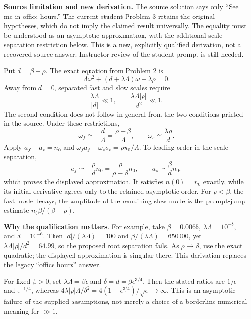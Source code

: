 \begin{draftsolution}
\textbf{Source limitation and new derivation.} The source solution says only
``See me in office hours.'' The current student Problem 3 retains the
original hypotheses, which do not imply the claimed result universally.
The equality must be understood as an asymptotic approximation, with the
additional scale-separation restriction below. This is a new, explicitly
qualified derivation, not a recovered source answer. Instructor review of
the student prompt is still needed.

Put $d=\beta-\rho$. The exact equation from Problem 2 is
\[
\Lambda\omega^2+(d+\lambda\Lambda)\omega-\lambda\rho=0.
\]
Away from $d=0$, separated fast and slow scales require
\[
\frac{\lambda\Lambda}{|d|}\ll1,\qquad
\frac{\lambda\Lambda|\rho|}{d^2}\ll1.
\]
The second condition does not follow in general from the two conditions
printed in the source. Under these restrictions,
\[
\omega_f\simeq-\frac d\Lambda=\frac{\rho-\beta}\Lambda,
\qquad \omega_s\simeq\frac{\lambda\rho}d.
\]
Apply $a_f+a_s=n_0$ and
$\omega_f a_f+\omega_s a_s=\rho n_0/\Lambda$.
To leading order in the scale separation,
\[
a_f\simeq-\frac\rho d n_0=\frac\rho{\rho-\beta}n_0,
\qquad a_s\simeq\frac\beta d n_0,
\]
which proves the displayed approximation. It satisfies $n(0)=n_0$ exactly,
while its initial derivative agrees only to the retained asymptotic order.
For $\rho<\beta$, the fast mode decays; the amplitude of the remaining
slow mode is the prompt-jump estimate $n_0\beta/(\beta-\rho)$.

\textbf{Why the qualification matters.} For example, take
$\beta=0.0065$, $\lambda\Lambda=10^{-8}$, and $d=10^{-6}$.
Then $|d|/(\lambda\Lambda)=100$ and $\beta/(\lambda\Lambda)=650000$, yet
$\lambda\Lambda|\rho|/d^2=64.99$, so the proposed root separation fails.
As $\rho\to\beta$, use the exact quadratic; the displayed approximation
is singular there. This derivation replaces the legacy ``office hours'' answer.

For fixed $\beta>0$, set $\lambda\Lambda=\beta\epsilon$ and
$\delta=d=\beta\epsilon^{3/4}$. Then the stated ratios are
$1/\epsilon$ and $\epsilon^{-1/4}$, whereas
$4\lambda|\rho|\Lambda/\delta^2
=4(1-\epsilon^{3/4})/\sqrt{\epsilon}\to\infty$.
This is an asymptotic failure of the supplied assumptions, not merely a
choice of a borderline numerical meaning for $\gg1$.

\end{draftsolution}

